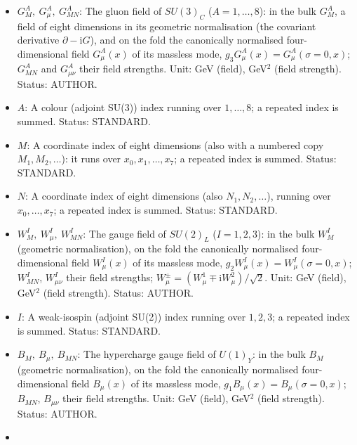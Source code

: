 \documentclass[
  10pt,
]{article}
\begin{document}
\begin{itemize}
  eight dimensions of \(U(1)_Y\), \(SU(2)_L\) and \(SU(3)_C\): the
  coefficients of the kinetic terms of the gauge fields of the bulk in
  their geometric normalisation; the four-dimensional couplings are
  \(g_k^2 = 3H\mathsf{g}_k^2/(2V_*)\). Unit: GeV\(^{-2}\)
  (\(\mathsf{g}^2\): length\(^4\)). Status: ASSUMED.
\item
  \(G^A_M,\ G^A_\mu,\ G^A_{MN}\): The gluon field of \(SU(3)_C\)
  (\(A = 1, \dots, 8\)): in the bulk \(G^A_M\), a field of eight
  dimensions in its geometric normalisation (the covariant derivative
  \(\partial - \mathrm{i}G\)), and on the fold the canonically
  normalised four-dimensional field \(G^A_\mu(x)\) of its massless mode,
  \(g_3G^A_\mu(x) = G^A_\mu(\sigma = 0, x)\); \(G^A_{MN}\) and
  \(G^A_{\mu\nu}\) their field strengths. Unit: GeV (field), GeV\(^2\)
  (field strength). Status: AUTHOR.
\item
  \(A\): A colour (adjoint SU(3)) index running over \(1, \dots, 8\); a
  repeated index is summed. Status: STANDARD.
\item
  \(M\): A coordinate index of eight dimensions (also with a numbered
  copy \(M_1, M_2, \dots\)): it runs over \(x_0, x_1, \dots, x_7\); a
  repeated index is summed. Status: STANDARD.
\item
  \(N\): A coordinate index of eight dimensions (also
  \(N_1, N_2, \dots\)), running over \(x_0, \dots, x_7\); a repeated
  index is summed. Status: STANDARD.
\item
  \(W^I_M,\ W^I_\mu,\ W^I_{MN}\): The gauge field of \(SU(2)_L\)
  (\(I = 1, 2, 3\)): in the bulk \(W^I_M\) (geometric normalisation), on
  the fold the canonically normalised four-dimensional field
  \(W^I_\mu(x)\) of its massless mode,
  \(g_2W^I_\mu(x) = W^I_\mu(\sigma = 0, x)\); \(W^I_{MN}\),
  \(W^I_{\mu\nu}\) their field strengths;
  \(W^\pm_\mu = (W^1_\mu \mp \mathrm{i}W^2_\mu)/\sqrt2\). Unit: GeV
  (field), GeV\(^2\) (field strength). Status: AUTHOR.
\item
  \(I\): A weak-isospin (adjoint SU(2)) index running over \(1, 2, 3\);
  a repeated index is summed. Status: STANDARD.
\item
  \(B_M,\ B_\mu,\ B_{MN}\): The hypercharge gauge field of \(U(1)_Y\):
  in the bulk \(B_M\) (geometric normalisation), on the fold the
  canonically normalised four-dimensional field \(B_\mu(x)\) of its
  massless mode, \(g_1B_\mu(x) = B_\mu(\sigma = 0, x)\); \(B_{MN}\),
  \(B_{\mu\nu}\) their field strengths. Unit: GeV (field), GeV\(^2\)
  (field strength). Status: AUTHOR.
\item

\end{itemize}
\end{document}
